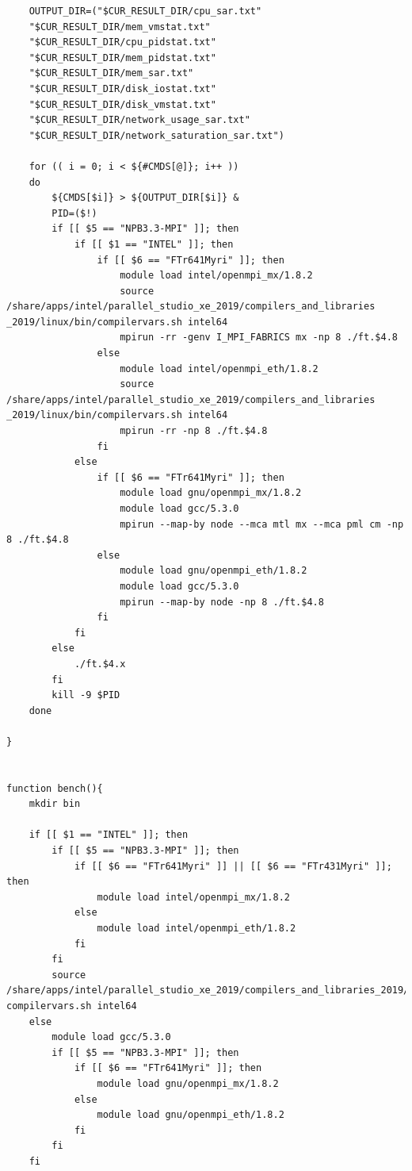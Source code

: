 \documentclass{article}
\begin{document}
\begin{appendices}
\begin{verbatim}
    OUTPUT_DIR=("$CUR_RESULT_DIR/cpu_sar.txt"
    "$CUR_RESULT_DIR/mem_vmstat.txt"
    "$CUR_RESULT_DIR/cpu_pidstat.txt"
    "$CUR_RESULT_DIR/mem_pidstat.txt"
    "$CUR_RESULT_DIR/mem_sar.txt"
    "$CUR_RESULT_DIR/disk_iostat.txt"
    "$CUR_RESULT_DIR/disk_vmstat.txt"
    "$CUR_RESULT_DIR/network_usage_sar.txt"
    "$CUR_RESULT_DIR/network_saturation_sar.txt")

    for (( i = 0; i < ${#CMDS[@]}; i++ ))
    do
        ${CMDS[$i]} > ${OUTPUT_DIR[$i]} &
        PID=($!)
        if [[ $5 == "NPB3.3-MPI" ]]; then
            if [[ $1 == "INTEL" ]]; then
                if [[ $6 == "FTr641Myri" ]]; then
                    module load intel/openmpi_mx/1.8.2
                    source /share/apps/intel/parallel_studio_xe_2019/compilers_and_libraries
_2019/linux/bin/compilervars.sh intel64
                    mpirun -rr -genv I_MPI_FABRICS mx -np 8 ./ft.$4.8
                else
                    module load intel/openmpi_eth/1.8.2
                    source /share/apps/intel/parallel_studio_xe_2019/compilers_and_libraries
_2019/linux/bin/compilervars.sh intel64
                    mpirun -rr -np 8 ./ft.$4.8
                fi
            else
                if [[ $6 == "FTr641Myri" ]]; then
                    module load gnu/openmpi_mx/1.8.2
                    module load gcc/5.3.0
                    mpirun --map-by node --mca mtl mx --mca pml cm -np 8 ./ft.$4.8
                else
                    module load gnu/openmpi_eth/1.8.2
                    module load gcc/5.3.0
                    mpirun --map-by node -np 8 ./ft.$4.8
                fi
            fi
        else
            ./ft.$4.x
        fi
        kill -9 $PID
    done

}


function bench(){
    mkdir bin
    
    if [[ $1 == "INTEL" ]]; then
        if [[ $5 == "NPB3.3-MPI" ]]; then
            if [[ $6 == "FTr641Myri" ]] || [[ $6 == "FTr431Myri" ]]; then
                module load intel/openmpi_mx/1.8.2
            else
                module load intel/openmpi_eth/1.8.2
            fi
        fi
        source /share/apps/intel/parallel_studio_xe_2019/compilers_and_libraries_2019/linux/bin/
compilervars.sh intel64
    else
        module load gcc/5.3.0
        if [[ $5 == "NPB3.3-MPI" ]]; then
            if [[ $6 == "FTr641Myri" ]]; then
                module load gnu/openmpi_mx/1.8.2
            else
                module load gnu/openmpi_eth/1.8.2
            fi
        fi
    fi


\end{verbatim}
\end{appendices}
\end{document}
